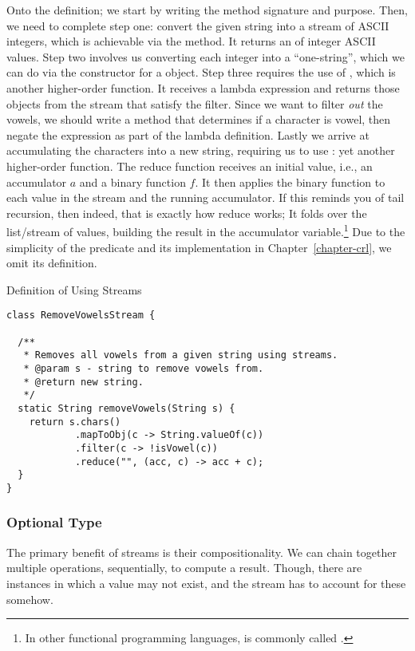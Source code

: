 Onto the definition; we start by writing the method signature and purpose. Then, we need to complete step one: convert the given string into a stream of ASCII integers, which is achievable via the  method. It returns an  of integer ASCII values. Step two involves us converting each integer into a ``one-string'', which we can do via the constructor for a  object. Step three requires the use of , which is another higher-order function. It receives a lambda expression and returns those objects from the stream that satisfy the filter. Since we want to filter \textit{out} the vowels, we should write a method that determines if a character is vowel, then negate the expression as part of the lambda definition. Lastly we arrive at accumulating the characters into a new string, requiring us to use : yet another higher-order function. The reduce function receives an initial value, i.e., an accumulator $a$ and a binary function $f$. It then applies the binary function to each value in the stream and the running accumulator. If this reminds you of tail recursion, then indeed, that is exactly how reduce works; It folds over the list/stream of values, building the result in the accumulator variable.\footnote{In other functional programming languages,  is commonly called .} Due to the simplicity of the  predicate and its implementation in Chapter~\ref{chapter-crl}, we omit its definition.

\begin{cl}[]{Definition of  Using Streams}
\begin{lstlisting}[language=MyJava]
class RemoveVowelsStream {

  /**
   * Removes all vowels from a given string using streams.
   * @param s - string to remove vowels from.
   * @return new string.
   */
  static String removeVowels(String s) {
    return s.chars()
            .mapToObj(c -> String.valueOf(c))
            .filter(c -> !isVowel(c))
            .reduce("", (acc, c) -> acc + c);
  }
}
\end{lstlisting}
\end{cl}

\subsubsection*{Optional Type}
The primary benefit of streams is their compositionality. We can chain together multiple operations, sequentially, to compute a result. Though, there are instances in which a value may not exist, and the stream has to account for these somehow.

